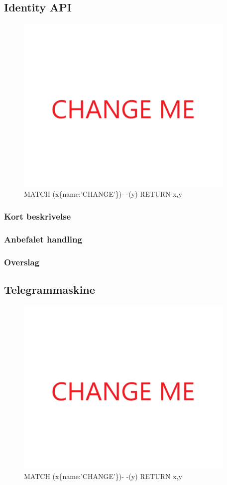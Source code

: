 \documentclass{article}
\begin{document}
\subsection{Identity API}
\begin{figure}[h]
\includegraphics[width=300pt]{CHANGE.PNG}
\caption{MATCH (x\{name:'CHANGE'\})- -(y) RETURN x,y}
\end{figure}
\subsubsection{Kort beskrivelse}
\subsubsection{Anbefalet handling}
\subsubsection{Overslag}


\subsection{Telegrammaskine}
\begin{figure}[h]
\includegraphics[width=300pt]{CHANGE.PNG}
\caption{MATCH (x\{name:'CHANGE'\})- -(y) RETURN x,y}
\end{figure}
\end{document}

